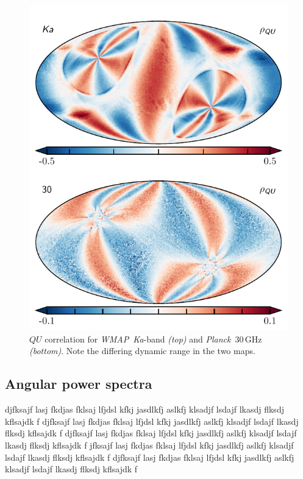 \documentclass[twocolumn]{../../common/aa}
\def\WMAP{\emph{WMAP}}
\def\Planck{\emph{Planck}}
\newcommand{\Ka}[0]{\textit{Ka}}
\begin{document}
\begin{figure}
	\includegraphics[width=\columnwidth]{figures/rho_QU.pdf}
	\caption{$QU$ correlation for \WMAP\ \Ka-band \textit{(top)} and \Planck\ 30\,GHz \textit{(bottom)}. Note the differing dynamic range in the two maps.}
	\label{fig:rho_qu}
\end{figure}

\subsection{Angular power spectra}

djfksajf lasj fkdjas fklsaj lfjdsl kfkj jasdlkfj aslkfj klsadjf lsdajf lkasdj flksdj kflsajdk f
djfksajf lasj fkdjas fklsaj lfjdsl kfkj jasdlkfj aslkfj klsadjf lsdajf lkasdj flksdj kflsajdk f
djfksajf lasj fkdjas fklsaj lfjdsl kfkj jasdlkfj aslkfj klsadjf lsdajf lkasdj flksdj kflsajdk f
jfksajf lasj fkdjas fklsaj lfjdsl kfkj jasdlkfj aslkfj klsadjf lsdajf lkasdj flksdj kflsajdk f
djfksajf lasj fkdjas fklsaj lfjdsl kfkj jasdlkfj aslkfj klsadjf lsdajf lkasdj flksdj kflsajdk f
\end{document}
